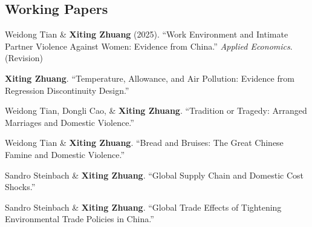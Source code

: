 \documentclass[10.5pt,letterpaper]{article}
\renewenvironment{itemize}{
	\begin{list}{}{
			\setlength{\leftmargin}{1.5em}
		}
	}{
	\end{list}
}
\begin{document}
	\subsection*{\textbf{Working Papers}}
	\begin{itemize}
		\item[-] Weidong Tian \& \textbf{Xiting Zhuang} (2025).  
		``Work Environment and Intimate Partner Violence Against Women: Evidence from China.''  
		\textit{Applied Economics}. (Revision)
		
		\item[-] \textbf{Xiting Zhuang}.  
		``Temperature, Allowance, and Air Pollution: Evidence from Regression Discontinuity Design.''
		
		\item[-] Weidong Tian, Dongli Cao, \& \textbf{Xiting Zhuang}.  
		``Tradition or Tragedy: Arranged Marriages and Domestic Violence.''
		
		\item[-] Weidong Tian \& \textbf{Xiting Zhuang}.  
		``Bread and Bruises: The Great Chinese Famine and Domestic Violence.''
		
		\item[-] Sandro Steinbach \& \textbf{Xiting Zhuang}.  
		``Global Supply Chain and Domestic Cost Shocks.''
		
		\item[-] Sandro Steinbach \& \textbf{Xiting Zhuang}.  
		``Global Trade Effects of Tightening Environmental Trade Policies in China.''
	\end{itemize}
	
\end{document}
